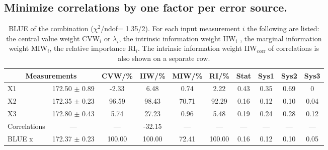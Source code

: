 \subsection{Minimize correlations by one factor per error source.}
\begin{table}[H]
\scriptsize
\begin{center}
\renewcommand{\arraystretch}{1.1}
\begin{tabular}{|lc|c|c|c|c|cccc|}
\hline
\multicolumn{2}{|c|}{Measurements} & CVW/\%  & IIW/\%  & MIW/\%  & RI/\%  & {\tiny Stat} & {\tiny Sys1} & {\tiny Sys2} & {\tiny Sys3}\\
\hline
X1 &     172.50 $\pm$       0.89 &      -2.33 &       6.48 &       0.74 &       2.22 &       0.43 &       0.35 &       0.69 &  0\\
X2 &     172.35 $\pm$       0.23 &      96.59 &      98.43 &      70.71 &      92.29 &       0.16 &       0.12 &       0.10 &       0.04\\
X3 &     172.80 $\pm$       0.43 &       5.74 &      27.23 &       0.96 &       5.48 &       0.19 &       0.24 &       0.28 &       0.12\\
Correlations & --- & --- &     -32.15 & --- & --- & --- & --- & --- & ---\\
\hline
BLUE {\tiny x} &     172.37 $\pm$       0.23 &     100.00 &     100.00 &      72.41 &     100.00 &       0.16 &       0.12 &       0.10 &       0.05\\
\hline
\end{tabular}
\caption{BLUE of the combination ($\chi^2$/ndof=      1.35/2).
 For each input measurement $i$ the following are listed: the central value weight CVW$_i$ or $\lambda_i$, the intrinsic information weight IIW$_i$ , the marginal information weight MIW$_i$, the relative importance RI$_i$. The intrinsic information weight IIW$_{\mathrm{corr}}$ of correlations is also shown on a separate row.}
\renewcommand{\arraystretch}{1}
\end{center}
\end{table}
